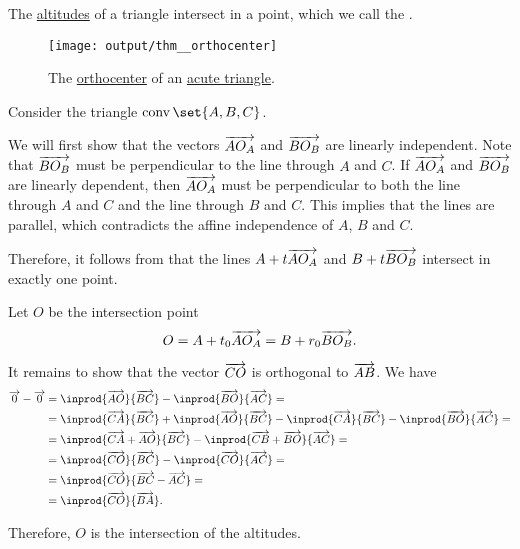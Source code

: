 \begin{proposition}\label{thm:orthocenter}\mimprovised
  The \hyperref[def:triangle_altitude]{altitudes} of a triangle intersect in a point, which we call the .

  \begin{figure}[!ht]
    \centering
    \texttt{[image: output/thm\_\_orthocenter]}
    \caption{The \hyperref[thm:orthocenter]{orthocenter} of an \hyperref[def:triangle/measure/acute]{acute triangle}.}\label{fig:thm:orthocenter}
  \end{figure}
\end{proposition}
\begin{defproof}
  Consider the triangle \( \conv\set{ A, B, C } \).

  We will first show that the vectors \( \overrightarrow{A O_A} \) and \( \overrightarrow{B O_B} \) are linearly independent. Note that \( \overrightarrow{B O_B} \) must be perpendicular to the line through \( A \) and \( C \). If \( \overrightarrow{A O_A} \) and \( \overrightarrow{B O_B} \) are linearly dependent, then  \( \overrightarrow{A O_A} \) must be perpendicular to both the line through \( A \) and \( C \) and the line through \( B \) and \( C \). This implies that the lines are parallel, which contradicts the affine independence of \( A \), \( B \) and \( C \).

  Therefore, it follows from  that the lines \( A + t \overrightarrow{A O_A} \) and \( B + t \overrightarrow{B O_B} \) intersect in exactly one point.

  Let \( O \) be the intersection point
  \begin{equation*}
    O = A + t_0 \overrightarrow{A O_A} = B + r_0 \overrightarrow{B O_B}.
  \end{equation*}

  It remains to show that the vector \( \overrightarrow{CO} \) is orthogonal to \( \overrightarrow{AB} \). We have
  \begin{align*}
    \vect 0 - \vect 0
    &=
    \inprod {\vect{AO}} {\vect{BC}} - \inprod {\vect{BO}} {\vect{AC}}
    = \\ &=
    \inprod {\vect{CA}} {\vect{BC}} + \inprod {\vect{AO}} {\vect{BC}} - \inprod {\vect{CA}} {\vect{BC}} - \inprod {\vect{BO}} {\vect{AC}}
    = \\ &=
    \inprod {\vect{CA} + \vect{AO}} {\vect{BC}} - \inprod {\vect{CB} + \vect{BO}} {\vect{AC}}
    = \\ &=
    \inprod {\vect{CO}} {\vect{BC}} - \inprod {\vect{CO}} {\vect{AC}}
    = \\ &=
    \inprod {\vect{CO}} {\vect{BC} - \vect{AC}}
    = \\ &=
    \inprod {\vect{CO}} {\vect{BA}}.
  \end{align*}

  Therefore, \( O \) is the intersection of the altitudes.
\end{defproof}

